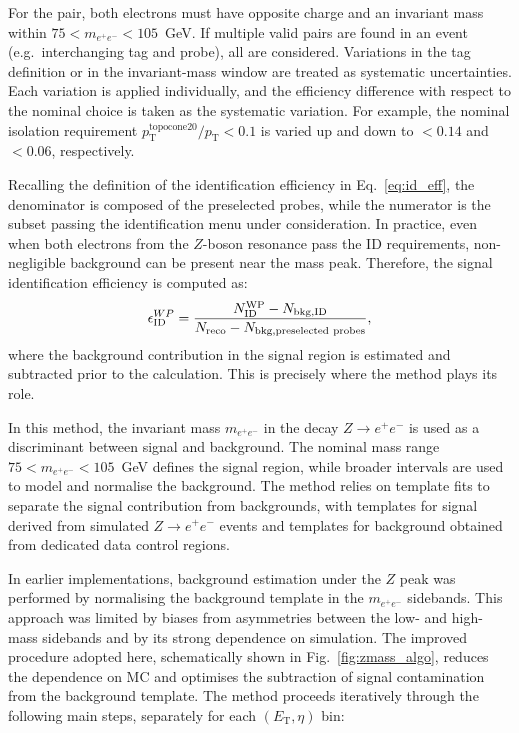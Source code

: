 For the \tp pair, both electrons must have opposite charge and an invariant mass within $75 < m_{e^+e^-} < 105$~GeV. If multiple valid pairs are found in an event (e.g.\ interchanging tag and probe), all are considered. Variations in the tag definition or in the invariant-mass window are treated as systematic uncertainties. Each variation is applied individually, and the efficiency difference with respect to the nominal choice is taken as the systematic variation. For example, the nominal isolation requirement $p_{\mathrm{T}}^{\mathrm{topocone20}}/p_{\mathrm{T}}<0.1$ is varied up and down to $<0.14$ and $<0.06$, respectively.

Recalling the definition of the identification efficiency in Eq.~\ref{eq:id_eff}, the denominator is composed of the preselected probes, while the numerator is the subset passing the identification menu under consideration. In practice, even when both electrons from the $Z$-boson resonance pass the ID requirements, non-negligible background can be present near the mass peak. Therefore, the signal identification efficiency is computed as:
\begin{equation}
  \small 
  \epsilon^{WP}_{\mathrm{ID}} = \frac{N^{\mathrm{WP}}_{\mathrm{ID}} - N_{\mathrm{bkg,ID}}}{N_{\mathrm{reco}} - N_{\mathrm{bkg,preselected\ probes}}},
\label{eq:id_eff}  
\end{equation}
where the background contribution in the signal region is estimated and subtracted prior to the calculation. This is precisely where the \zmass method plays its role.

In this method, the invariant mass $m_{e^+e^-}$ in the decay $Z\rightarrow e^+e^-$ is used as a discriminant between signal and background. The nominal mass range $75 < m_{e^+e^-} < 105$~GeV defines the signal region, while broader intervals are used to model and normalise the background. The method relies on template fits to separate the signal contribution from backgrounds, with templates for signal derived from simulated $Z\rightarrow e^+e^-$ events and templates for background obtained from dedicated data control regions.

In earlier implementations, background estimation under the $Z$ peak was performed by normalising the background template in the $m_{e^+e^-}$ sidebands. This approach was limited by biases from asymmetries between the low- and high-mass sidebands and by its strong dependence on simulation. The improved procedure adopted here, schematically shown in Fig.~\ref{fig:zmass_algo}, reduces the dependence on MC and optimises the subtraction of signal contamination from the background template. The method proceeds iteratively through the following main steps, separately for each $(E_{\mathrm{T}},\eta)$ bin:

